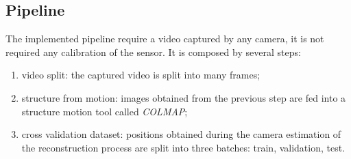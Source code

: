 \subsection{Pipeline}
The implemented pipeline require a video captured by any camera, it is not required any calibration of the sensor. It is composed by several steps:
\begin{enumerate}
    \item video split: the captured video is split into many frames; 
    \item structure from motion: images obtained from the previous step are fed into a structure motion tool called \textit{COLMAP};
    \item cross validation dataset: positions obtained during the camera estimation of the reconstruction process are split into three batches: train, validation, test.
\end{enumerate}
